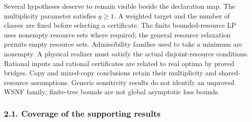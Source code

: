 \documentclass[english,11pt,a4paper]{article}
\newcounter{none}
\begin{document}
Several hypotheses deserve to remain visible beside the declaration map.
The multiplicity parameter satisfies \(q\ge1\). A weighted target and
the number of classes are fixed before selecting a certificate. The
finite bounded-resource LP uses nonempty resource sets where required;
the general resource relaxation permits empty resource sets.
Admissibility families used to take a minimum are nonempty. A physical
realizer must satisfy the actual disjoint-resource conditions. Rational
inputs and rational certificates are related to real optima by proved
bridges. Copy and mixed-copy conclusions retain their multiplicity and
shared-resource assumptions. Generic sensitivity results do not identify
an unproved WSNF family; finite-tree bounds are not global asymptotic
loss bounds.

\subsubsection{2.1. Coverage of the supporting
results}\label{coverage-of-the-supporting-results}
\end{document}
